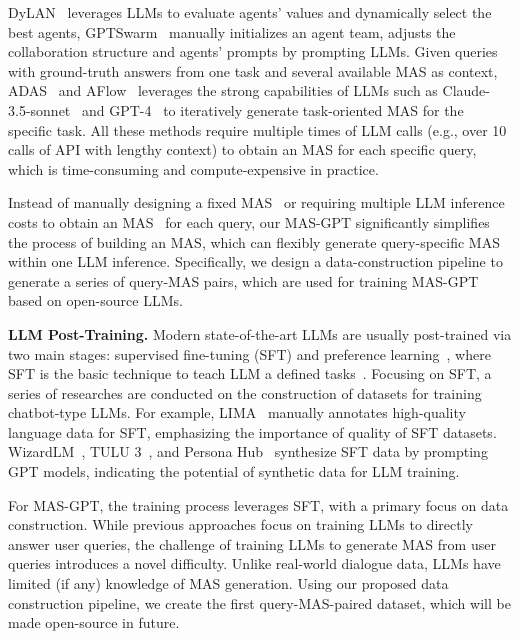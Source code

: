\documentclass{article}
\theoremstyle{plain}
\theoremstyle{definition}
\theoremstyle{remark}
\begin{document}
DyLAN~\cite{liu2024dynamic} leverages LLMs to evaluate agents' values and dynamically select the best agents, GPTSwarm~\cite{zhugegptswarm} manually initializes an agent team, adjusts the collaboration structure and agents' prompts by prompting LLMs.
Given queries with ground-truth answers from one task and several available MAS as context, ADAS~\cite{hu2024automated} and AFlow~\cite{zhang2024aflow} leverages the strong capabilities of LLMs such as Claude-3.5-sonnet~\cite{claude3.5} and GPT-4~\cite{openai2023gpt4} to iteratively generate task-oriented MAS for the specific task.
All these methods require multiple times of LLM calls (e.g., over 10 calls of API with lengthy context) to obtain an MAS for each specific query, which is time-consuming and compute-expensive in practice.

Instead of manually designing a fixed MAS~\cite{qian2024chatdev,chen2023agentverse,duimproving} or requiring multiple LLM inference costs to obtain an MAS~\cite{liu2024dynamic,zhugegptswarm} for each query, our MAS-GPT significantly simplifies the process of building an MAS, which can flexibly generate query-specific MAS within one LLM inference.
Specifically, we design a data-construction pipeline to generate a series of query-MAS pairs, which are used for training MAS-GPT based on open-source LLMs.

\textbf{LLM Post-Training.}
Modern state-of-the-art LLMs are usually post-trained via two main stages: supervised fine-tuning (SFT) and preference learning~\cite{ouyang2022training,dubey2024llama,yang2024qwen2,fancombatting}, where SFT is the basic technique to teach LLM a defined tasks~\cite{zhou2023lima,longpre2023flan}.
Focusing on SFT, a series of researches are conducted on the construction of datasets for training chatbot-type LLMs.
For example, LIMA~\cite{zhou2023lima} manually annotates high-quality language data for SFT, emphasizing the importance of quality of SFT datasets.
WizardLM~\cite{xu2024wizardlm}, TULU 3~\cite{lambert2024t}, and Persona Hub~\cite{ge2024scaling} synthesize SFT data by prompting GPT models, indicating the potential of synthetic data for LLM training.

For MAS-GPT, the training process leverages SFT, with a primary focus on data construction.
While previous approaches focus on training LLMs to directly answer user queries, the challenge of training LLMs to generate MAS from user queries introduces a novel difficulty.
Unlike real-world dialogue data, LLMs have limited (if any) knowledge of MAS generation.
Using our proposed data construction pipeline, we create the first query-MAS-paired dataset, which will be made open-source in future.
\end{document}
